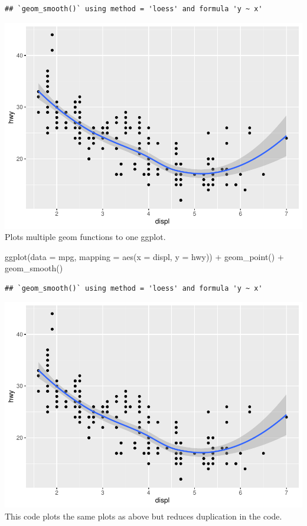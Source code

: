\documentclass[
]{article}
\newenvironment{Shaded}{\begin{snugshade}}{\end{snugshade}}
\newcommand{\AttributeTok}[1]{\textcolor[rgb]{0.77,0.63,0.00}{#1}}
\newcommand{\FunctionTok}[1]{\textcolor[rgb]{0.00,0.00,0.00}{#1}}
\newcommand{\NormalTok}[1]{#1}
\newcommand{\SpecialCharTok}[1]{\textcolor[rgb]{0.00,0.00,0.00}{#1}}
\begin{document}
\begin{verbatim}
## `geom_smooth()` using method = 'loess' and formula 'y ~ x'
\end{verbatim}

\includegraphics{Assignments_files/figure-latex/unnamed-chunk-44-1.pdf}
Plots multiple geom functions to one ggplot.

\begin{Shaded}
\begin{Highlighting}[]
\FunctionTok{ggplot}\NormalTok{(}\AttributeTok{data =}\NormalTok{ mpg, }\AttributeTok{mapping =} \FunctionTok{aes}\NormalTok{(}\AttributeTok{x =}\NormalTok{ displ, }\AttributeTok{y =}\NormalTok{ hwy)) }\SpecialCharTok{+} 
  \FunctionTok{geom\_point}\NormalTok{() }\SpecialCharTok{+} 
  \FunctionTok{geom\_smooth}\NormalTok{()}
\end{Highlighting}
\end{Shaded}

\begin{verbatim}
## `geom_smooth()` using method = 'loess' and formula 'y ~ x'
\end{verbatim}

\includegraphics{Assignments_files/figure-latex/unnamed-chunk-45-1.pdf}
This code plots the same plots as above but reduces duplication in the
code.
\end{document}
